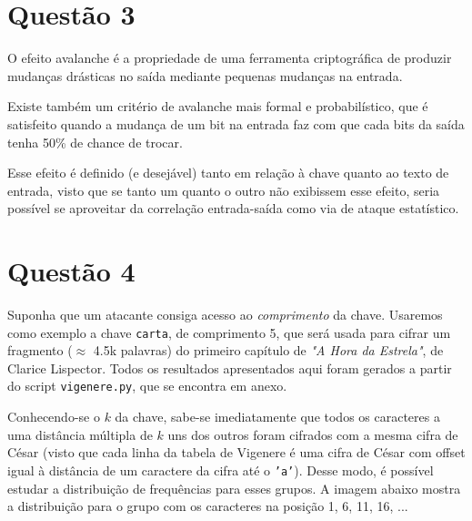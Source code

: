\documentclass{article}
\begin{document}
\section*{Questão 3}

O efeito avalanche é a propriedade de uma ferramenta criptográfica de produzir mudanças drásticas no saída mediante pequenas mudanças na entrada. 

Existe também um critério de avalanche mais formal e probabilístico, que é satisfeito quando a mudança de um bit na entrada faz com que cada bits da saída tenha 50\% de chance de trocar.

Esse efeito é definido (e desejável) tanto em relação à chave quanto ao texto de entrada, visto que se tanto um quanto o outro não exibissem esse efeito, seria possível se aproveitar da correlação entrada-saída como via de ataque estatístico.

\section*{Questão 4}

    Suponha que um atacante consiga acesso ao \textit{comprimento} da chave. Usaremos como exemplo a chave \texttt{carta}, de comprimento 5, que será usada para cifrar um fragmento ($\approx$ 4.5k palavras) do primeiro capítulo de \textit{"A Hora da Estrela"}, de Clarice Lispector. Todos os resultados apresentados aqui foram gerados a partir do script \texttt{vigenere.py}, que se encontra em anexo.

    Conhecendo-se o $k$ da chave, sabe-se imediatamente que todos os caracteres a uma distância múltipla de $k$ uns dos outros foram cifrados com a mesma cifra de César (visto que cada linha da tabela de Vigenere é uma cifra de César com offset igual à distância de um caractere da cifra até o \texttt{'a'}). Desse modo, é possível estudar a distribuição de frequências para esses grupos. A imagem abaixo mostra a distribuição para o grupo com os caracteres na posição 1, 6, 11, 16, ...
\end{document}
